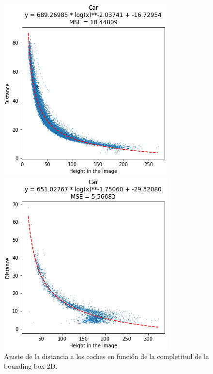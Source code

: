 \begin{figure}[H]
	\begin{minipage}{0.45\textwidth}
		\centering
		\includegraphics[width=0.87\linewidth]{Book/figures/6_approx_distancia/car_bb_complete_kitti1.png}
	\end{minipage}\hfill
	\begin{minipage}{0.45\textwidth}
		\centering
		\includegraphics[width=0.9\linewidth]{Book/figures/6_approx_distancia/car_bb_incomplete_kitti1.png}
	\end{minipage}
	\caption{Ajuste de la distancia a los coches en función de la completitud de la bounding box 2D.}
	\label{fig:Ajuste de la distancia a los coches en función de la completitud de la bounding box 2D.}
\end{figure}

